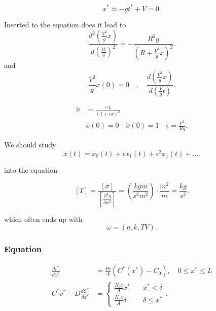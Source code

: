 \documentclass{article}
\theoremstyle{remark}
\begin{document}
\begin{equation*}
  x^{*} \approx -g t^{*} + V = 0
.\end{equation*}


Inserted to the equation does it lead to 
\begin{equation*}
  \frac{d ^2 \left( \frac{V^2}{g}x \right)}{d \left( \frac{Vt}{g} \right)^2}  = - \frac{R^2g}{\left( R + \frac{V^2}{g}x \right)^2}
.\end{equation*}
and
\begin{equation*}
  \frac{V^2}{g}x\left( 0 \right) = 0 \quad  , \quad  \frac{d \left( \frac{V^2}{g}x \right)}{d \left( \frac{V}{g}t \right)}   
.\end{equation*}

\begin{align*}
  \ddot{x} &= \frac{-1}{\left( 1 + \epsilon x \right)^2} \\
   & x\left( 0 \right) = 0   \quad  \dot{x}\left( 0 \right) = 1  \quad  \epsilon = \frac{V^2}{Rg} 
.\end{align*}



We should study 
\begin{equation*}
  x\left( t \right) = x_{0}\left( t \right) + \epsilon x_{1}\left( t \right) + \epsilon ^{2} x_{1}\left( t \right) + \ldots
.\end{equation*}

into the equation


\begin{equation*}
  \left[ T \right] = \frac{\left[ \sigma \right]}{ \left[ \frac{\partial ^2 \eta}{\partial x^2}  \right]} = \left( \frac{kgm}{s^2 m ^2} \right)  \cdot  \frac{m^2}{m} = \frac{kg}{s^2}
.\end{equation*}

which often ends up with 
\begin{equation*}
  \omega  = \left( a, k ,T V \right)
.\end{equation*}

\subsubsection{Equation}%
\label{ssub:equation}

\begin{align}
  \label{eq:label}
  \frac{d v^{*}}{d x^{*}} &= \frac{Pc}{A} \left( C^{*}\left( x^{*} \right) - C_0 \right) , \quad  0 \le x^{*} \le L   \\
  C^{*} v^{*} - D \frac{d C^{*}}{d x^{*}}  &=  \begin{cases}
    \frac{N_0 c}{A} x^{*}  &  \quad  x^{*} < \delta \\
    \frac{N_0 c}{A}  \delta  & \quad  \delta \le x^{*} 
  \end{cases} 
.\end{align}
\end{document}
